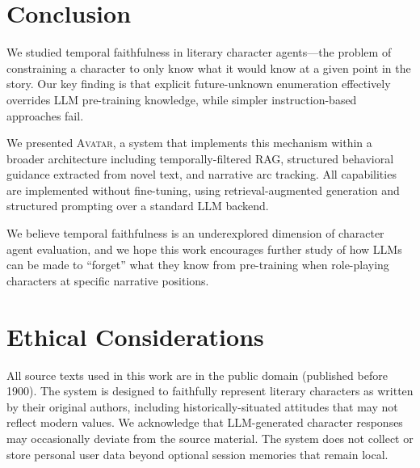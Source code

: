 \documentclass[11pt,a4paper]{article}
\begin{document}
\section{Conclusion}
\label{sec:conclusion}

We studied temporal faithfulness in literary character agents---the problem of constraining a character to only know what it would know at a given point in the story.
Our key finding is that explicit future-unknown enumeration effectively overrides LLM pre-training knowledge, while simpler instruction-based approaches fail.

We presented \textsc{Avatar}, a system that implements this mechanism within a broader architecture including temporally-filtered RAG, structured behavioral guidance extracted from novel text, and narrative arc tracking.
All capabilities are implemented without fine-tuning, using retrieval-augmented generation and structured prompting over a standard LLM backend.

We believe temporal faithfulness is an underexplored dimension of character agent evaluation, and we hope this work encourages further study of how LLMs can be made to ``forget'' what they know from pre-training when role-playing characters at specific narrative positions.

\section*{Ethical Considerations}

All source texts used in this work are in the public domain (published before 1900).
The system is designed to faithfully represent literary characters as written by their original authors, including historically-situated attitudes that may not reflect modern values.
We acknowledge that LLM-generated character responses may occasionally deviate from the source material.
The system does not collect or store personal user data beyond optional session memories that remain local.



\end{document}

